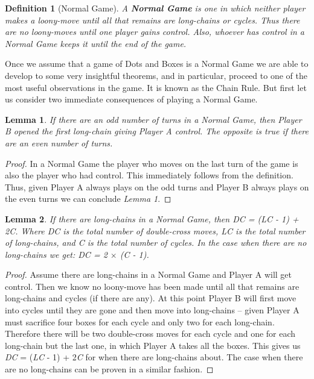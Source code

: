 \documentclass[12pt,twoside]{reedthesis}
\newtheorem{mydef}{Definition}
\newtheorem{lemma}{Lemma}
\begin{document}
\begin{mydef}[Normal Game]
A \textbf{Normal Game} is one in which neither player makes a loony-move until all that remains are long-chains or cycles.  Thus there are no loony-moves until one player gains control.  Also, whoever has control in a Normal Game keeps it until the end of the game.
\end{mydef}

Once we assume that a game of Dots and Boxes is a Normal Game we are able to develop to some very insightful theorems, and in particular, proceed to one of the most useful observations in the game.  It is known as the Chain Rule.  But first let us consider two immediate consequences of playing a Normal Game.

\begin{lemma}
If there are an odd number of turns in a Normal Game, then Player B opened the first long-chain giving Player A control. The opposite is true if there are an even number of turns.
\end{lemma}

\begin{proof}
In a Normal Game the player who moves on the last turn of the game is also the player who had control.  This immediately follows from the definition.  Thus, given Player A always plays on the odd turns and Player B always plays on the even turns we can conclude \emph{Lemma 1}.
\end{proof}

\begin{lemma}
If there are long-chains in a Normal Game, then DC = (LC - 1) + 2C.  Where DC is the total number of double-cross moves, LC is the total number of long-chains, and C is the total number of cycles.  In the case when there are no long-chains we get: DC = 2 $\times$ (C - 1).
\end{lemma}

\begin{proof}
Assume there are long-chains in a Normal Game and Player A will get control.  Then we know no loony-move has been made until all that remains are long-chains and cycles (if there are any).  At this point Player B will first move into cycles until they are gone and then move into long-chains -- given Player A must sacrifice four boxes for each cycle and only two for each long-chain.  Therefore there will be two double-cross moves for each cycle and one for each long-chain but the last one, in which Player A takes all the boxes.  This gives us \emph{DC} = (\emph{LC} - 1) + 2\emph{C} for when there are long-chains about.  The case when there are no long-chains can be proven in a similar fashion.
\end{proof}
\end{document}
